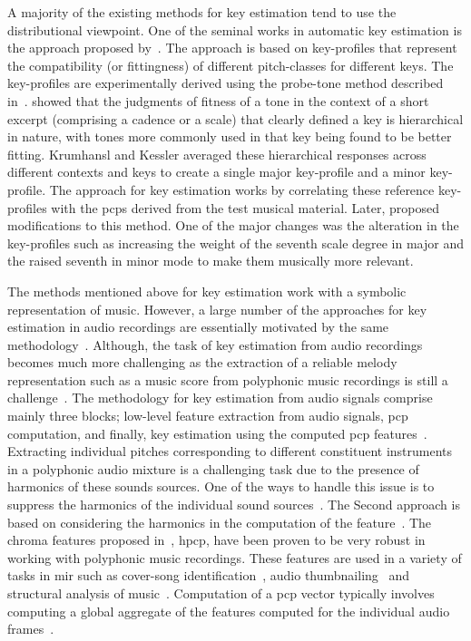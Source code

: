 A majority of the existing methods for key estimation tend to use the distributional viewpoint. One of the seminal works in automatic key estimation is the approach proposed by~\cite{KrumhanslKessler82,krumhansl2001cognitive}. The approach is based on key-profiles that represent the compatibility (or fittingness) of different pitch-classes for different keys. The key-profiles are experimentally derived using the probe-tone method described in~\cite{krumhansl1979quantification}. \cite{krumhansl1979quantification} showed that the judgments of fitness of a tone in the context of a short excerpt (comprising a cadence or a scale) that clearly defined a key is hierarchical in nature, with tones more commonly used in that key being found to be better fitting. Krumhansl and Kessler averaged these hierarchical responses across different contexts and keys to create a single major key-profile and a minor key-profile. The approach for key estimation works by correlating these reference key-profiles with the \glspl{pcp} derived from the test musical material. Later, \cite{temperley1999s} proposed modifications to this method. One of the major changes was the alteration in the key-profiles such as increasing the weight of the seventh scale degree in major and the raised seventh in minor mode to make them musically more relevant. 

The methods mentioned above for key estimation work with a symbolic representation of music. However, a large number of the approaches for key estimation in audio recordings are essentially motivated by the same methodology~\citep{gomez2006tonal,pauws2004musical,peeters2006chroma}. Although, the task of key estimation from audio recordings becomes much more challenging as the extraction of a reliable melody representation such as a music score from polyphonic music recordings is still a challenge~\citep{gomez2006tonal}. The methodology for key estimation from audio signals comprise mainly three blocks; low-level feature extraction from audio signals, \gls{pcp} computation, and finally, key estimation using the computed \gls{pcp} features~\citep{peeters2006chroma}. Extracting individual pitches corresponding to different constituent instruments in a polyphonic audio mixture is a challenging task due to the presence of harmonics of these sounds sources. One of the ways to handle this issue is to suppress the harmonics of the individual sound sources~\citep{cremer2004a,peeters2006chroma}. The Second approach is based on considering the harmonics in the computation of the feature~\citep{gomez2006tonal,izmirli2005template}. The chroma features proposed in~\cite{gomez2006tonal}, \gls{hpcp}, have been proven to be very robust in working with polyphonic music recordings. These features are used in a variety of tasks in \gls{mir} such as cover-song identification~\citep{joan_thesis}, audio thumbnailing~\citep{bartsch2001catch} and structural analysis of music~\citep{paulus2006music}. Computation of a \gls{pcp} vector typically involves computing a global aggregate of the features computed for the individual audio frames~\citep{izmirli2005template,pauws2004musical}. 

